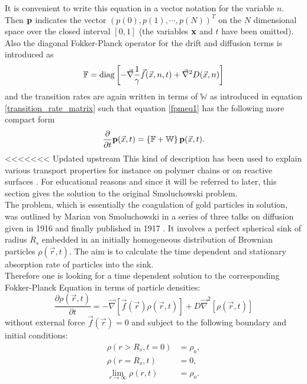 It is convenient to write this equation in a vector notation for the variable $n$. Then $\boldsymbol{\mathbf{p}}$ indicates the vector $(p(0),p(1),\cdots,p(N))^{T}$ on the $N$ dimensional space over the closed interval $[0,1]$ (the variables $\boldsymbol{\mathbf{x}}$ and $t$ have been omitted). \\ 
Also the diagonal Fokker-Planck operator for the drift and diffusion terms is introduced as
\begin{equation}
    \mathbb{F} = {\rm diag} \left[- \vec{ \nabla } \frac{1}{\gamma}\vec{f}(\vec{x},n,t) + \vec{\nabla}^{2} D(\vec{x},n) \right]
    \label{fpo}
\end{equation}
and the transition rates are again written in terms of $\mathbb{W}$ as introduced in equation \eqref{transition_rate_matrix} such that equation \eqref{fpmeq1} has the following more compact form
\begin{equation}
    \frac{\partial}{\partial t} \boldsymbol{\mathbf{p}}(\vec{x},t) = \left\{ \mathbb{F} + \mathbb{W} \right\} \boldsymbol{\mathbf{p}}(\vec{x},t).
    \label{fpmeq2}
\end{equation}
<<<<<<< Updated upstream
This kind of description has been used to explain various transport properties for instance on polymer chains or on reactive surfaces \cite{Friedman1968,Caceres1990}.
For educational reasons and since it will be referred to later, this section gives the solution to the original Smoluchowski problem. \\
The problem, which is essentially the coagulation of gold particles in solution, was outlined by Marian von Smoluchowski in a series of three talks on diffusion given in 1916 \cite{Smoluchowski1916} and finally published in 1917 \cite{Smoluchowski1917a}. It involves a perfect spherical sink of radius $R_s$ embedded in an initially homogeneous distribution of Brownian particles $\rho(\vec{r},t)$. The aim is to calculate the time dependent and stationary absorption rate of particles into the sink. \\
Therefore one is looking for a time dependent solution to the corresponding Fokker-Planck Equation in terms of particle densities:
\begin{equation}
        \frac{\partial \rho(\vec{r},t)}{\partial t} = - \vec \nabla \left[ \vec f(\vec{r})\rho(\vec{r},t) \right] + D\vec \nabla ^2 \left[\rho(\vec{r},t) \right] 
    \label{FPE3}
\end{equation}
without external force $\vec{f}(\vec{r})=0$ and subject to the following boundary and initial conditions:
\begin{align}
    \rho(r > R_s, t = 0) &= \rho_o, \\
    \rho(r=R_s,t) &= 0, \\
    \lim_{r \rightarrow \infty} \rho(r, t) &= \rho_o.
    \label{BC}
\end{align}
